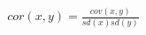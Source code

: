 \documentclass[10pt]{article}
\begin{document}
\begin{align*}cor(x,y) = \frac{cov(x,y)}{sd(x)sd(y)}\end{align*}
\end{document}
